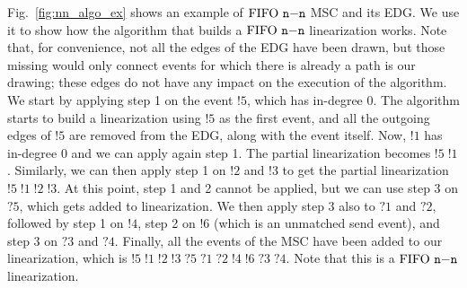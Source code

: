 \begin{example}
	Fig.~\ref{fig:nn_algo_ex} shows an example of $\text{FIFO } \mathtt{n\mathsf{-}n}$ MSC and its EDG. We use it to show how the algorithm that builds a $\text{FIFO } \mathtt{n\mathsf{-}n}$ linearization works. Note that, for convenience, not all the edges of the EDG have been drawn, but those missing would only connect events for which there is already a path is our drawing; these edges do not have any impact on the execution of the algorithm. We start by applying step 1 on the event $!5$, which has in-degree 0. The algorithm starts to build a linearization using $!5$ as the first event, and all the outgoing edges of $!5$ are removed from the EDG, along with the event itself. Now, $!1$ has in-degree 0 and we can apply again step 1. The partial linearization becomes $!5\;!1$. Similarly, we can then apply step 1 on $!2$ and $!3$ to get the partial linearization $!5\;!1\;!2\;!3$. At this point, step 1 and 2 cannot be applied, but we can use step 3 on $?5$, which gets added to linearization. We then apply step 3 also to $?1$ and $?2$, followed by step 1 on $!4$, step 2 on $!6$ (which is an unmatched send event), and step 3 on $?3$ and $?4$. Finally, all the events of the MSC have been added to our linearization, which is $!5\;!1\;!2\;!3\;?5\;?1\;?2\;!4\;!6\;?3\;?4$. Note that this is a $\text{FIFO } \mathtt{n\mathsf{-}n}$ linearization.
\end{example}

